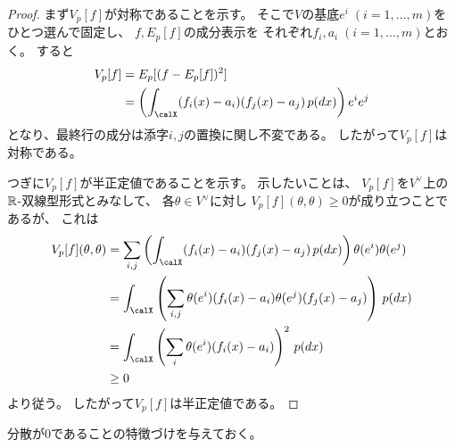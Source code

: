 \documentclass[report]{jlreq}
\begin{document}
\begin{proof}
    まず$V_p[f]$が対称であることを示す。
    そこで$V$の基底$e^i \; (i = 1, \dots, m)$をひとつ選んで固定し、
    $f, E_p[f]$の成分表示を
    それぞれ$f_i, a_i \; (i = 1, \dots, m)$とおく。
    すると
    \begin{alignat}{1}
        V_p[f]
            &= E_p[(f - E_p[f])^2] \\
            &= \myparen{
                \int_\calX
                (f_i(x) - a_i)(f_j(x) - a_j)
                \, p(dx)
            } e^i e^j
    \end{alignat}
    となり、最終行の成分は添字$i, j$の置換に関し不変である。
    したがって$V_p[f]$は対称である。

    つぎに$V_p[f]$が半正定値であることを示す。
    示したいことは、
    $V_p[f]$を$V^\vee$上の$\mathbb{R}$-双線型形式とみなして、
    各$\theta \in V^\vee$に対し
    $V_p[f](\theta, \theta) \ge 0$が成り立つことであるが、
    これは
    \begin{alignat}{1}
        V_p[f](\theta, \theta)
            &= \sum_{i, j}
                \myparen{
                    \int_\calX (f_i(x) - a_i)(f_j(x) - a_j) \, p(dx)
                }
                \theta(e^i) \theta(e^j) \\
            &= \int_\calX \myparen{
                \sum_{i, j}
                \theta(e^i)(f_i(x) - a_i)
                \theta(e^j)(f_j(x) - a_j)
            } \, p(dx) \\
            &= \int_\calX \myparen{
                \sum_{i}
                \theta(e^i)(f_i(x) - a_i)
            }^2 \, p(dx) \\
            &\ge 0
    \end{alignat}
    より従う。
    したがって$V_p[f]$は半正定値である。
\end{proof}

分散が0であることの特徴づけを与えておく。

\end{document}
